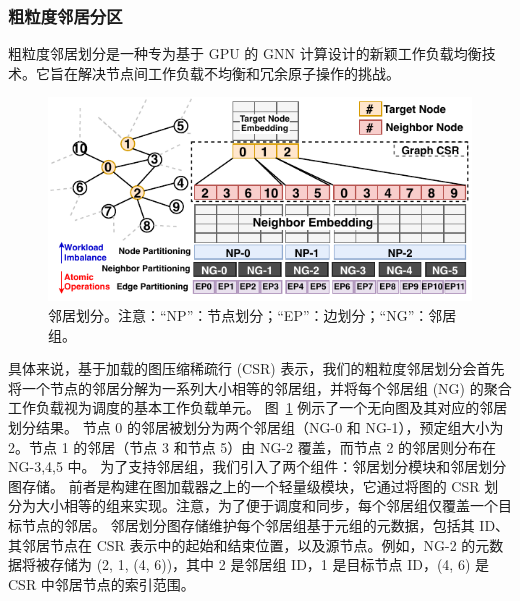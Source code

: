 \subsubsection{粗粒度邻居分区}
粗粒度邻居划分是一种专为基于 GPU 的 GNN 计算设计的新颖工作负载均衡技术。它旨在解决节点间工作负载不均衡和冗余原子操作的挑战。
\begin{figure} [ht]
    \centering
    \includegraphics[width=0.9\columnwidth]{images/group-based-partitioning.pdf}
    \caption{邻居划分。注意：“NP”：节点划分；“EP”：边划分；“NG”：邻居组。}
    \label{fig: Group-based aggregration}
\end{figure}

具体来说，基于加载的图压缩稀疏行 (CSR) 表示，我们的粗粒度邻居划分会首先将一个节点的邻居分解为一系列大小相等的邻居组，并将每个邻居组 (NG) 的聚合工作负载视为调度的基本工作负载单元。
图~\ref{fig: Group-based aggregration} 例示了一个无向图及其对应的邻居划分结果。
节点 0 的邻居被划分为两个邻居组（NG-0 和 NG-1），预定组大小为 2。节点 1 的邻居（节点 3 和节点 5）由 NG-2 覆盖，而节点 2 的邻居则分布在 NG-{3,4,5} 中。
为了支持邻居组，我们引入了两个组件：邻居划分模块和邻居划分图存储。
前者是构建在图加载器之上的一个轻量级模块，它通过将图的 CSR 划分为大小相等的组来实现。注意，为了便于调度和同步，每个邻居组仅覆盖一个目标节点的邻居。
邻居划分图存储维护每个邻居组基于元组的元数据，包括其 ID、其邻居节点在 CSR 表示中的起始和结束位置，以及源节点。例如，NG-2 的元数据将被存储为 (2, 1, (4, 6))，其中 2 是邻居组 ID，1 是目标节点 ID，(4, 6) 是 CSR 中邻居节点的索引范围。

